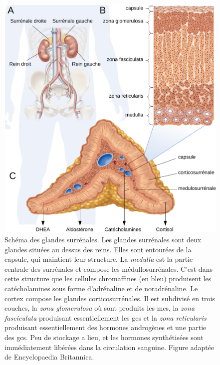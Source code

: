 \begin{figure}[!htbp]
\centering
\vspace{1\baselineskip}
\includegraphics[width=\textwidth]
{Figures/adrenal-gland/adrenal-gland.pdf}
\caption[Les glandes surrénales]
{
Schéma des glandes surrénales.
Les glandes surrénales sont deux glandes situées au dessus des reins.
Elles sont entourées de la capsule, qui maintient leur structure.
La \textit{medulla} est la partie centrale des surrénales et compose les médullosurrénales.
C'est dans cette structure que les cellules chromaffines (en bleu) produisent les catécholamines sous forme d'adrénaline et de noradrénaline.
Le cortex compose les glandes corticosurrénales.
Il est subdivisé en trois couches, la \textit{zona glomerulosa} où sont produits les \glspl{mc}, la \textit{zona fasciculata} produisant essentiellement les \glspl{gc} et la \textit{zona reticularis} produisant essentiellement des hormones androgènes et une partie des \glspl{gc}.
Peu de stockage a lieu, et les hormones synthétisées sont immédiatement libérées dans la circulation sanguine.
Figure adaptée de Encyclopaedia Britannica.
}
\label{fig:adrenal-gland}
\end{figure}